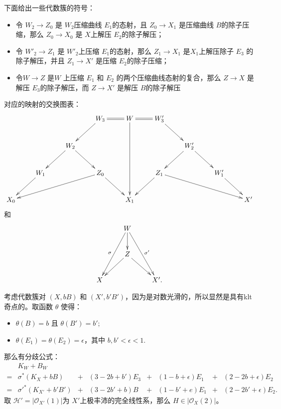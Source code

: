下面给出一些代数簇的符号：
\begin{itemize}
  \item 令 $W_{2}\to Z_{0}$ 是  $W_{2}$压缩曲线 $E_{1}$的态射，且 $Z_{0} \to X_{1}$ 是压缩曲线 $B$的除子压缩，那么 $Z_{0}\to X_{0}$ 是  $X$上解压 $E_{2}$的除子解压；
  \item 令 $W'_{2}\to Z_{1}$   是 $W'_{2}$上压缩 $E_{1}$的态射，那么 $Z_{1} \to X_{1}$ 是$X_{1}$上解压除子 $E_{3}$ 的除子解压，并且 $Z_{1}\to X'$ 是压缩 $E_{2}$的除子压缩；
  \item 令$W\to Z$ 是$W$ 上压缩  $E_{1}$ 和 $E_{2}$ 的两个压缩曲线态射的复合，那么 $Z\to X$ 是解压 $E_{3}$的除子解压，而 $Z\to X'$ 是解压 $B$的除子解压
\end{itemize}
对应的映射的交换图表：
\[ \xymatrix{&&&W_3\ar[ld]\ar@{=}[r]&W\ar[ddd]\ar@{=}[r]&W_3'\ar[rd]\\
    &&W_2\ar[ld]\ar[rd]&&&&W_2'\ar[rd]\ar[dl]\\
    &W_1\ar[ld]&&Z_0\ar[llld]\ar[rd]&&Z_1\ar[ld]\ar[rrrd]&&W_1'\ar[rd]\\
    X_0&&&&X_1&&&&X'
  } \]
  和
\[\xymatrix{
    &W\ar[d]\ar[ddl]_{\sigma}\ar[ddr]^{\sigma'}&\\
    &Z\ar[dl]\ar[dr]\\
    X&&X'. }  \]

考虑代数簇对 $ (X,bB) $ 和 $ (X',b'B') $，因为是对数光滑的，所以显然是具有klt奇点的。取函数 $\theta$ 使得：
\begin{itemize}
  \item $\theta(B)=b$ 且 $\theta(B')=b'$;
  \item $\theta(E_{1})=\theta(E_{2})=\epsilon$，其中 $b,b'<\epsilon<1$.
\end{itemize}
那么有分歧公式：
\[ \begin{array}{rllllllll}
      & K_W+B_W \\
    = & \sigma^*(K_X+bB)       & + & (3-2b+b')E_3 & + & (1-b+\epsilon)E_1 & + & (2-2b+\epsilon)E_2   \\
    = & \sigma'^*(K_{X'}+b'B') & + & (3-2b'+b)B   & + & (1-b'+e)E_1       & + & (2-2b'+\epsilon)E_2 .
  \end{array} \]
取 $ \mathcal{H}'=|\mathcal{O}_{X'}(1)| $为 $X'$上极丰沛的完全线性系，那么 $H\in |\mathcal{O}_{X}(2)|$。

